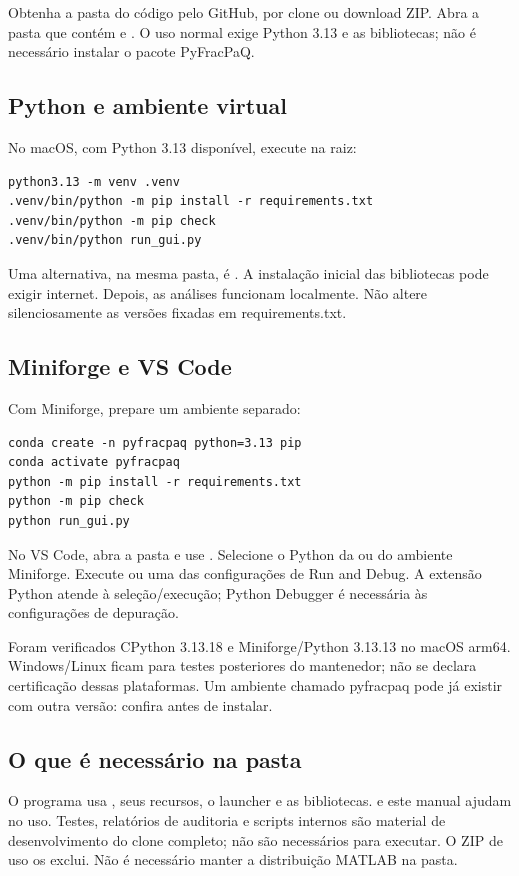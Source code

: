 \label{sec:inicio}
Obtenha a pasta do código pelo GitHub, por clone ou download ZIP. Abra a pasta que contém  e . O uso normal exige Python 3.13 e as bibliotecas; não é necessário instalar o pacote PyFracPaQ.

\subsection{Python e ambiente virtual}
No macOS, com Python 3.13 disponível, execute na raiz:
\begin{verbatim}
python3.13 -m venv .venv
.venv/bin/python -m pip install -r requirements.txt
.venv/bin/python -m pip check
.venv/bin/python run_gui.py
\end{verbatim}
Uma alternativa, na mesma pasta, é . A instalação inicial das bibliotecas pode exigir internet. Depois, as análises funcionam localmente. Não altere silenciosamente as versões fixadas em requirements.txt.

\subsection{Miniforge e VS Code}
Com Miniforge, prepare um ambiente separado:
\begin{verbatim}
conda create -n pyfracpaq python=3.13 pip
conda activate pyfracpaq
python -m pip install -r requirements.txt
python -m pip check
python run_gui.py
\end{verbatim}
No VS Code, abra a pasta e use . Selecione o Python da  ou do ambiente Miniforge. Execute  ou uma das configurações de Run and Debug. A extensão Python atende à seleção/execução; Python Debugger é necessária às configurações de depuração.

Foram verificados CPython 3.13.18 e Miniforge/Python 3.13.13 no macOS arm64. Windows/Linux ficam para testes posteriores do mantenedor; não se declara certificação dessas plataformas. Um ambiente chamado pyfracpaq pode já existir com outra versão: confira  antes de instalar.

\subsection{O que é necessário na pasta}
O programa usa , seus recursos, o launcher e as bibliotecas.  e este manual ajudam no uso. Testes, relatórios de auditoria e scripts internos são material de desenvolvimento do clone completo; não são necessários para executar. O ZIP de uso os exclui. Não é necessário manter a distribuição MATLAB na pasta.

